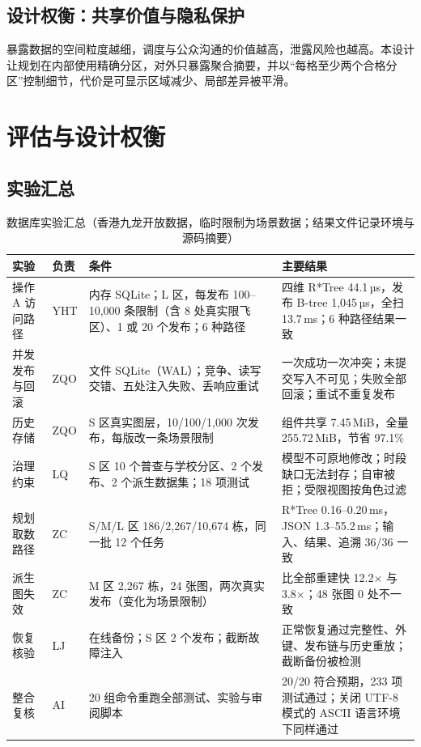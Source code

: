 \documentclass[a4paper,11pt,UTF8]{ctexart}
\begin{document}
\subsection{设计权衡：共享价值与隐私保护}

暴露数据的空间粒度越细，调度与公众沟通的价值越高，泄露风险也越高。本设计让规划在内部使用精确分区，对外只暴露聚合摘要，并以“每格至少两个合格分区”控制细节，代价是可显示区域减少、局部差异被平滑。

\section{评估与设计权衡}\label{sec:eval}

\subsection{实验汇总}

\begin{table}[!htbp]\centering\small
\caption{数据库实验汇总（香港九龙开放数据，临时限制为场景数据；结果文件记录环境与源码摘要）}\label{tab:exp}
\begin{tabularx}{\textwidth}{L{2.3cm}L{0.9cm}L{4cm}Y}
\toprule
实验 & 负责 & 条件 & 主要结果 \\
\midrule
操作 A 访问路径 & YHT & 内存 SQLite；L 区，每发布 100–10,000 条限制（含 8 处真实限飞区）、1 或 20 个发布；6 种路径 & 四维 R*Tree 44.1\,µs，发布 B-tree 1,045\,µs，全扫 13.7\,ms；6 种路径结果一致 \\
并发发布与回滚 & ZQO & 文件 SQLite（WAL）；竞争、读写交错、五处注入失败、丢响应重试 & 一次成功一次冲突；未提交写入不可见；失败全部回滚；重试不重复发布 \\
历史存储 & ZQO & S 区真实图层，10/100/1,000 次发布，每版改一条场景限制 & 组件共享 7.45\,MiB，全量 255.72\,MiB，节省 97.1\% \\
治理约束 & LQ & S 区 10 个普查与学校分区、2 个发布、2 个派生数据集；18 项测试 & 模型不可原地修改；时段缺口无法封存；自审被拒；受限视图按角色过滤 \\
规划取数路径 & ZC & S/M/L 区 186/2,267/10,674 栋，同一批 12 个任务 & R*Tree 0.16–0.20\,ms，JSON 1.3–55.2\,ms；输入、结果、追溯 36/36 一致 \\
派生图失效 & ZC & M 区 2,267 栋，24 张图，两次真实发布（变化为场景限制） & 比全部重建快 12.2× 与 3.8×；48 张图 0 处不一致 \\
恢复核验 & LJ & 在线备份；S 区 2 个发布；截断故障注入 & 正常恢复通过完整性、外键、发布链与历史重放；截断备份被检测 \\
整合复核 & AI & 20 组命令重跑全部测试、实验与审阅脚本 & 20/20 符合预期，233 项测试通过；关闭 UTF-8 模式的 ASCII 语言环境下同样通过 \\
\bottomrule
\end{tabularx}
\end{table}
\end{document}

